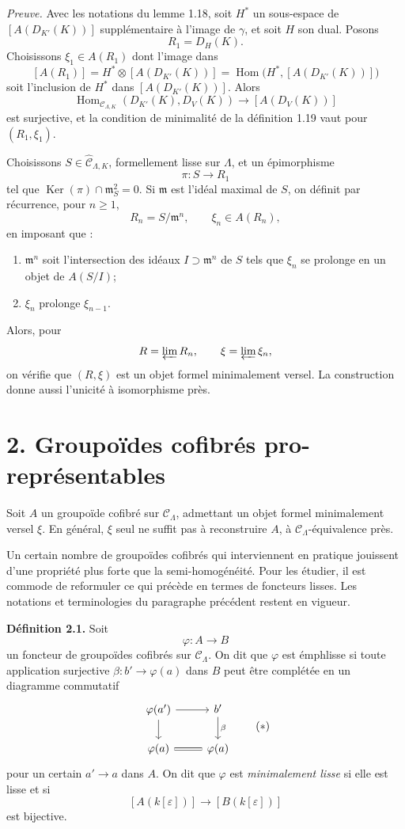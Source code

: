 \documentclass[11pt]{article}
\providecommand{\Ker}{\operatorname{Ker}}
\providecommand{\Hom}{\operatorname{Hom}}
\begin{document}
\emph{Preuve.} Avec les notations du lemme 1.18, soit \(H^\ast\) un sous-espace de
\([A(D_{K'}(K))]\) suppl\'ementaire \`a l'image de \(\gamma\), et soit \(H\) son dual.
Posons
\[
 R_1=D_H(K).
\]
Choisissons \(\xi_1\in A(R_1)\) dont l'image dans
\[
 [A(R_1)]=H^\ast\otimes[A(D_{K'}(K))]
 =\Hom\bigl(H^\ast,[A(D_{K'}(K))]\bigr)
\]
soit l'inclusion de \(H^\ast\) dans \([A(D_{K'}(K))]\). Alors
\[
 \Hom_{\mathcal C_{\Lambda,K}}(D_{K'}(K),D_V(K))
 \longrightarrow [A(D_V(K))]
\]
est surjective, et la condition de minimalit\'e de la d\'efinition 1.19 vaut pour
\((R_1,\xi_1)\).

Choisissons \(S\in\widehat{\mathcal C}_{\Lambda,K}\), formellement lisse sur \(\Lambda\),
et un \'epimorphisme
\[
 \pi:S\longrightarrow R_1
\]
tel que \(\Ker(\pi)\cap\mathfrak m_S^2=0\). Si \(\mathfrak m\) est l'id\'eal maximal
de \(S\), on d\'efinit par r\'ecurrence, pour \(n\geq1\),
\[
 R_n=S/\mathfrak m^n,\qquad \xi_n\in A(R_n),
\]
en imposant que :
\begin{enumerate}[label=(\alph*)]
\item \(\mathfrak m^n\) soit l'intersection des id\'eaux \(I\supset\mathfrak m^n\) de \(S\)
tels que \(\xi_n\) se prolonge en un objet de \(A(S/I)\);
\item \(\xi_n\) prolonge \(\xi_{n-1}\).
\end{enumerate}
Alors, pour
\[
 R=\varprojlim R_n,\qquad \xi=\varprojlim \xi_n,
\]
on v\'erifie que \((R,\xi)\) est un objet formel minimalement versel. La construction donne
aussi l'unicit\'e \`a isomorphisme pr\`es.

\section*{2. Groupo\"ides cofibr\'es pro-repr\'esentables}

Soit \(A\) un groupo\"ide cofibr\'e sur \(\mathcal C_\Lambda\), admettant un objet formel
minimalement versel \(\xi\). En g\'en\'eral, \(\xi\) seul ne suffit pas \`a reconstruire
\(A\), \`a \(\mathcal C_\Lambda\)-\'equivalence pr\`es.

Un certain nombre de groupo\"ides cofibr\'es qui interviennent en pratique jouissent d'une
propri\'et\'e plus forte que la semi-homog\'en\'eit\'e. Pour les \'etudier, il est commode de
reformuler ce qui pr\'ec\`ede en termes de foncteurs lisses. Les notations et terminologies
du paragraphe pr\'ec\'edent restent en vigueur.

\textbf{D\'efinition 2.1.} Soit
\[
 \varphi:A\longrightarrow B
\]
un foncteur de groupo\"ides cofibr\'es sur \(\mathcal C_\Lambda\). On dit que \(\varphi\)
est émph{lisse} si toute application surjective
\(\beta:b'\to\varphi(a)\) dans \(B\) peut \^etre compl\'et\'ee en un diagramme commutatif
\[
\begin{tikzcd}
\varphi(a') \arrow[r] \arrow[d] & b' \arrow[d,"\beta"]\\
\varphi(a) \arrow[r,equal] & \varphi(a)
\end{tikzcd}
\qquad\text{(\(*\))}
\]
pour un certain \(a'\to a\) dans \(A\). On dit que \(\varphi\) est
\emph{minimalement lisse} si elle est lisse et si
\[
 [A(k[\varepsilon])]\longrightarrow [B(k[\varepsilon])]
\]
est bijective.
\end{document}
